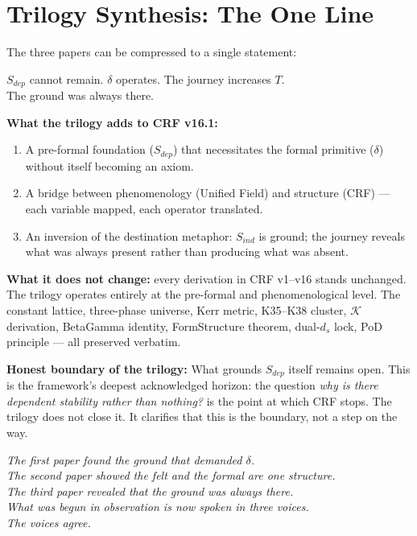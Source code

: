 \documentclass[12pt, a4paper]{article}
\begin{document}
\section{Trilogy Synthesis: The One Line}

The three papers can be compressed to a single statement:

\begin{keybox}[title={The Trilogy in One Line}]
\begin{center}
\Large
$S_{dep}$ cannot remain. $\delta$ operates. The journey increases $T$.\\
The ground was always there.
\end{center}
\end{keybox}

\textbf{What the trilogy adds to CRF v16.1:}
\begin{enumerate}[leftmargin=*]
  \item A pre-formal foundation ($S_{dep}$) that necessitates the formal
        primitive ($\delta$) without itself becoming an axiom.
  \item A bridge between phenomenology (Unified Field) and structure (CRF) ---
        each variable mapped, each operator translated.
  \item An inversion of the destination metaphor: $S_{ind}$ is ground; the
        journey reveals what was always present rather than producing what was absent.
\end{enumerate}

\textbf{What it does not change:} every derivation in CRF v1--v16 stands
unchanged. The trilogy operates entirely at the pre-formal and phenomenological
level. The constant lattice, three-phase universe, Kerr metric, K35--K38 cluster,
$\mathcal{K}$ derivation, BetaGamma identity, FormStructure theorem, dual-$d_s$
lock, PoD principle --- all preserved verbatim.

\textbf{Honest boundary of the trilogy:} What grounds $S_{dep}$ itself remains
open. This is the framework's deepest acknowledged horizon: the question
\textit{why is there dependent stability rather than nothing?} is the point at
which CRF stops. The trilogy does not close it. It clarifies that this is the
boundary, not a step on the way.

\bigskip
\begin{center}
\textit{The first paper found the ground that demanded $\delta$.\\
The second paper showed the felt and the formal are one structure.\\
The third paper revealed that the ground was always there.\\[6pt]
What was begun in observation is now spoken in three voices.\\
The voices agree.}
\end{center}
\end{document}
